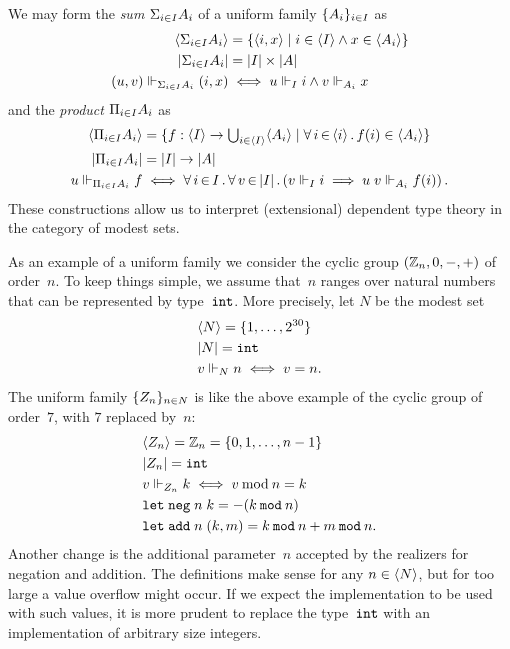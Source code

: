 We may form the \emph{sum} ${\Sigma_{i \in I} A_i}$ of a uniform family
$\{A_i\}_{i \in I}$ as
%
\begin{align*}
  \langle {\Sigma_{i \in I} A_i} \rangle &=
  \{\langle i,x \rangle \mid i \in \langle I \rangle \land x \in \langle A_i \rangle\}
  \\
  |{\Sigma_{i \in I} A_i}| &=
  |I| \times |A|
  \\
  (u,v) \Vdash_{{\Sigma_{i \in I} A_i}} (i,x)
  &\iff
  u \Vdash_I i \land v \Vdash_{A_i} x
\end{align*}
%
and the \emph{product} ${\Pi_{i \in I} A_i}$ as
%
\begin{align*}
  \langle {\Pi_{i \in I} A_i} \rangle &=
  \{f : \langle I \rangle \to {\textstyle \bigcup_{i \in \langle I \rangle} \langle A_i \rangle} \mid
    \forall\, i \,{\in}\, \langle i \rangle\,.\,f(i) \in \langle A_i \rangle\}
  \\
  |{\Pi_{i \in I} A_i}| &=
  |I| \to |A|
  \\
  u \Vdash_{{\Pi_{i \in I} A_i}} f
  &\iff
  \forall\, i \,{\in}\, I\,.\,\forall\, v \,{\in}\, |I|\,.\left(
      v \Vdash_I i \implies
      u \; v \Vdash_{A_i} f(i)
    \right).
\end{align*}
%
These constructions allow us to interpret (extensional) dependent type
theory in the category of modest sets.

As an example of a uniform family we consider the cyclic group
$(\mathbb{Z}_n, 0, {-}, {+})$ of order~$n$. To keep things simple, we assume
that~$n$ ranges over natural numbers that can be represented by
type~$\mathtt{int}$. More precisely, let $N$ be the modest set
%
\begin{align*}
  & \langle N \rangle = \{1, \ldots, 2^{30}\} \\
  & |N| = \mathtt{int} \\
  & v \Vdash_N n \iff v = n.
\end{align*}
%
The uniform family $\{Z_n\}_{n \in N}$ is like the above example
of the cyclic group of order~$7$, with $7$ replaced by~$n$:
%
\begin{align*}
  & \langle Z_n \rangle = \mathbb{Z}_n = \{0, 1, \ldots, n - 1\}
  \\
  & |Z_n| = \mathtt{int}
  \\
  & v \Vdash_{Z_n} k \iff v \mathbin{\mathrm{mod}} n = k
  \\
  & \mathtt{let}\;\mathtt{neg} \; n \; k  = - (k \mathbin{\mathtt{mod}} n)
  \\
  & \mathtt{let}\;\mathtt{add} \; n \; (k,m) = k \mathbin{\mathtt{mod}} n + m \mathbin{\mathtt{mod}} n.
\end{align*}
%
Another change is the additional parameter~$n$ accepted by the
realizers for negation and addition. The definitions make sense for
any $n \in \langle N \rangle$, but for too large a value overflow might occur.
If we expect the implementation to be used with such values, it is
more prudent to replace the type~$\mathtt{int}$ with an implementation of
arbitrary size integers.


